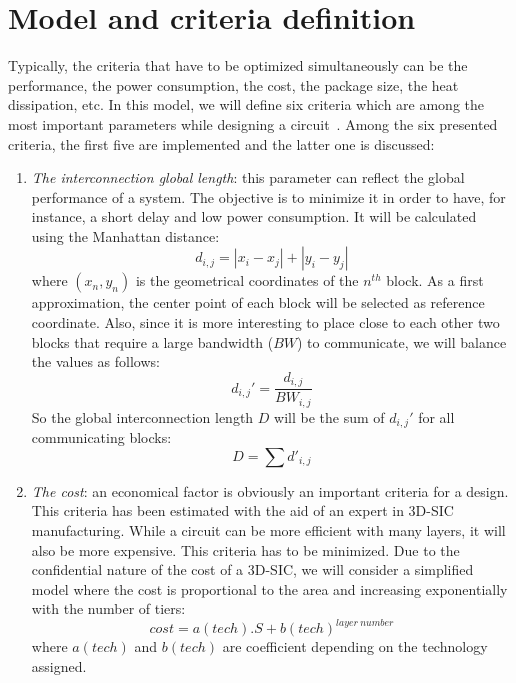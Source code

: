 \section{Model and criteria definition}
Typically, the criteria that have to be optimized simultaneously can be the performance, the power consumption, the cost, the package size, the heat dissipation, etc. In this model, we will define six criteria which are among the most important parameters while designing a circuit~\cite{DBLP:conf/3dic/MilojevicCCRRSAPM09}. Among the six presented criteria, the first five are implemented and the latter one is discussed:
\begin{enumerate}
\item \textit{The interconnection global length}: this parameter can reflect the global performance of a system. The objective is to minimize it in order to have, for instance, a short delay and low power consumption. It will be calculated using the Manhattan distance:
\begin{equation}
d_{i,j}=|x_i-x_j|+|y_i-y_j|
\end{equation}
where $(x_n, y_n)$ is the geometrical coordinates of the $n^{th}$ block. As a first approximation, the center point of each block will be selected as reference coordinate. Also, since it is more interesting to place close to each other two blocks that require a large bandwidth ($BW$) to communicate, we will balance the values as follows:
\begin{equation}
d_{i,j}'=\frac{d_{i,j}}{BW_{i,j}}
\end{equation}
So the global interconnection length $D$ will be the sum of $d_{i,j}'$ for all communicating blocks:
\begin{equation}
D=\sum d'_{i,j}
\end{equation}
\item \textit{The cost}: an economical factor is obviously an important criteria for a design. This criteria has been estimated with the aid of an expert in 3D-SIC manufacturing. While a circuit can be more efficient with many layers, it will also be more expensive. This criteria has to be minimized. Due to the confidential nature of the cost of a 3D-SIC, we will consider a simplified model where the cost is proportional to the area and increasing exponentially with the number of tiers:
\begin{equation}
cost=a(tech).S+b(tech)^{layer~number}
\label{eqn:cost}
\end{equation}
where $a(tech)$ and $b(tech)$ are coefficient depending on the technology assigned.

\end{enumerate}
